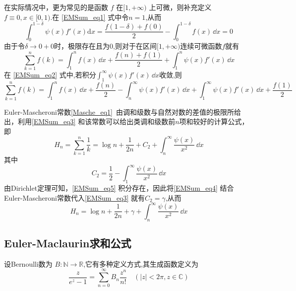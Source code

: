 在实际情况中，更为常见的是函数 $f$ 在$[1,+\infty)$ 上可微，则补充定义$ f\equiv 0,x\in[0,1)$.在 \autoref{EMSum_eq1} 式中令$n=1$,从而
\[
    \int_{0}^{1-\delta}\psi(x)f'(x)\mathrm{d}x
    =\frac{f(1-\delta)+f(0)}{2}-\int_{0}^{1-\delta}f(x)\,\dd x=0
\]
由于令$\delta\to0+0$时，极限存在且为$0$,则对于在区间$[1,+\infty)$连续可微函数$f$就有
\begin{equation}\label{EMSum_eq2}
    \sum_{k=1}^{n}f(k)
    =\int_{1}^{n}f(x)\,\dd x+\frac{f(n)+f(1)}{2}+\int_{1}^{n}\psi(x)f'(x)\,\dd x
\end{equation}
在 \autoref{EMSum_eq2}  式中,若积分$\displaystyle{\int_{1}^{\infty}\psi(x)f'(x)\,\dd x}$收敛,则
\begin{equation}\label{EMSum_eq3}
    \sum_{k=1}^{n}f(k)=\int_{1}^{n}f(x)\,\dd x
    +\frac{f(n)}{2}-\int_{n}^{\infty}\psi(x)f'(x)\,\dd x
    +\int_{1}^{\infty}\psi(x)f'(x)\,\dd x+\frac{f(1)}{2}
\end{equation}
\begin{exercise}{}
Euler-Mascheroni常数\autoref{Masche_eq1}~由调和级数与自然对数的差值的极限所给出，利用\autoref{EMSum_eq3} 和该常数可以给出类调和级数前$n$项和较好的计算公式，即
\begin{equation}\label{EMSum_eq4}
    H_{n}=\sum_{k=1}^{n}\frac{1}{k}=\log n+\frac{1}{2n}+C_{2}
    +\int_{n}^{\infty}\frac{\psi(x)}{x^2}\,\dd x
\end{equation}
其中
\begin{equation}\label{EMSum_eq5}
    C_{2}=\frac{1}{2}-\int_{1}^{\infty}\frac{\psi(x)}{x^2}\,\dd x
\end{equation}
由Dirichlet定理可知，\autoref{EMSum_eq5} 积分存在，因此将\autoref{EMSum_eq4} 结合
Euler-Mascheroni常数代入\autoref{EMSum_eq3} 就有$C_{2}=\gamma$,从而
\begin{equation}
    H_{n}=\log n+\frac{1}{2n}+\gamma+\int_{n}^{\infty}\frac{\psi(x)}{x^2}\,\dd x
\end{equation}
\end{exercise}


\subsection{Euler-Maclaurin求和公式}

\begin{definition}{}
设Bernoulli数为 $B:\mathbb{N}\to\mathbb{R} $,它有多种定义方式,其生成函数定义为
    \begin{equation}{}
        \frac{z}{e^{z}-1}=\sum_{n=0}^{\infty}B_{n}\frac{z^{n}}{n!}
        \quad(|z|<2\pi,z\in{\mathbb C})
    \end{equation}
\end{definition}
	

